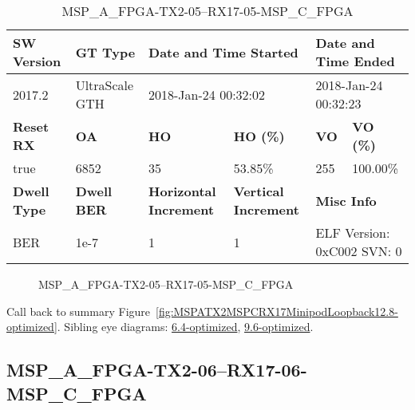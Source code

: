 \begin{table}[h]
\centering
\caption{MSP\_A\_FPGA-TX2-05--RX17-05-MSP\_C\_FPGA}
\label{tab:MSPAFPGATX205RX1705MSPCFPGA12.8-optimized}
\begin{tabular}{@{}|l|l|l|l|l|l|@{}}
\toprule
\textbf{SW Version}                & \textbf{GT Type}   & \multicolumn{2}{l|}{\textbf{Date and Time Started}}            & \multicolumn{2}{l|}{\textbf{Date and Time Ended}}        \\ \midrule
2017.2                       & UltraScale GTH          & \multicolumn{2}{l|}{2018-Jan-24 00:32:02}                   & \multicolumn{2}{l|}{2018-Jan-24 00:32:23}               \\ \midrule
\textbf{Reset RX}                  & \textbf{OA} & \textbf{HO}   & \textbf{HO (\%)} & \textbf{VO} & \textbf{VO (\%)} \\ \midrule
true & 6852        & 35          & 53.85\%        & 255        & 100.00\%       \\ \midrule
\textbf{Dwell Type}                & \textbf{Dwell BER} & \textbf{Horizontal Increment} & \textbf{Vertical Increment}    & \multicolumn{2}{l|}{\textbf{Misc Info}}                  \\ \midrule
BER                            & 1e-7        & 1        & 1           & \multicolumn{2}{l|}{ELF Version: 0xC002 SVN: 0}                         \\ \bottomrule
\end{tabular}
\end{table}

\begin{figure}[h]
\caption{MSP\_A\_FPGA-TX2-05--RX17-05-MSP\_C\_FPGA} \label{fig:MSPAFPGATX205RX1705MSPCFPGA12.8-optimized}
\end{figure}

Call back to summary Figure~\ref{fig:MSPATX2MSPCRX17MinipodLoopback12.8-optimized}.
Sibling eye diagrams: \hyperref[sec:MSPAFPGATX205RX1705MSPCFPGA6.4-optimized]{6.4-optimized}, \hyperref[sec:MSPAFPGATX205RX1705MSPCFPGA9.6-optimized]{9.6-optimized}.

\clearpage
\newpage


\subsection{MSP\_A\_FPGA-TX2-06--RX17-06-MSP\_C\_FPGA}\label{sec:MSPAFPGATX206RX1706MSPCFPGA12.8-optimized}

